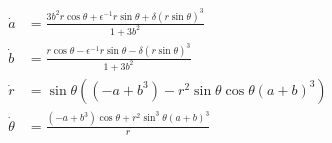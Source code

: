 \documentclass[11pt,reqno]{amsart}
\begin{document}

\begin{equation}
\begin{split}
\dot{a} &= \frac{ 3b^2 r\cos\theta  +\epsilon^{-1}r\sin\theta + \delta \left( r\sin\theta\right)^3}{1+3b^2}\\
\dot{b}&= \frac{ r\cos\theta -\epsilon^{-1}r\sin\theta - \delta \left( r\sin\theta\right)^3}{1+3b^2}\\
\dot{r} &=\sin\theta\left( \left( -a + b^3\right) - r^2\sin\theta\cos\theta( a + b)^3\right)\\
\dot{\theta} &= \frac{\left( -a + b^3\right)\cos\theta + r^2\sin^3\theta( a + b)^3}{r}\\
\end{split}
\end{equation}
\end{document}
